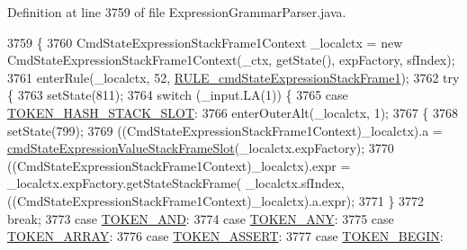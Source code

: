 Definition at line 3759 of file Expression\+Grammar\+Parser.\+java.


\begin{DoxyCode}
3759                                                                                                            
                                                       \{
3760     CmdStateExpressionStackFrame1Context \_localctx = \textcolor{keyword}{new} CmdStateExpressionStackFrame1Context(\_ctx, 
      getState(), expFactory, sfIndex);
3761     enterRule(\_localctx, 52, \hyperlink{classgov_1_1nasa_1_1jpf_1_1inspector_1_1server_1_1expression_1_1parser_1_1_expression_grammar_parser_a36207a7edb5ce0a44295fb39c0ab6bde}{RULE\_cmdStateExpressionStackFrame1});
3762     \textcolor{keywordflow}{try} \{
3763       setState(811);
3764       \textcolor{keywordflow}{switch} (\_input.LA(1)) \{
3765       \textcolor{keywordflow}{case} \hyperlink{classgov_1_1nasa_1_1jpf_1_1inspector_1_1server_1_1expression_1_1parser_1_1_expression_grammar_parser_af911dcf03b24cbbe3be88f0445668139}{TOKEN\_HASH\_STACK\_SLOT}:
3766         enterOuterAlt(\_localctx, 1);
3767         \{
3768         setState(799);
3769         ((CmdStateExpressionStackFrame1Context)\_localctx).a = 
      \hyperlink{classgov_1_1nasa_1_1jpf_1_1inspector_1_1server_1_1expression_1_1parser_1_1_expression_grammar_parser_a6b064d2ec6f62d4260a820ef3c1864e9}{cmdStateExpressionValueStackFrameSlot}(\_localctx.expFactory);
3770          ((CmdStateExpressionStackFrame1Context)\_localctx).expr =  \_localctx.expFactory.getStateStackFrame(
      \_localctx.sfIndex,   ((CmdStateExpressionStackFrame1Context)\_localctx).a.expr); 
3771         \}
3772         \textcolor{keywordflow}{break};
3773       \textcolor{keywordflow}{case} \hyperlink{classgov_1_1nasa_1_1jpf_1_1inspector_1_1server_1_1expression_1_1parser_1_1_expression_grammar_parser_a331667ae98e64b4bcdd3b866e7e2cd64}{TOKEN\_AND}:
3774       \textcolor{keywordflow}{case} \hyperlink{classgov_1_1nasa_1_1jpf_1_1inspector_1_1server_1_1expression_1_1parser_1_1_expression_grammar_parser_a21f8df7c638568302922694eab614972}{TOKEN\_ANY}:
3775       \textcolor{keywordflow}{case} \hyperlink{classgov_1_1nasa_1_1jpf_1_1inspector_1_1server_1_1expression_1_1parser_1_1_expression_grammar_parser_a5245a46acb46b8f00f1e7ef7d32101ea}{TOKEN\_ARRAY}:
3776       \textcolor{keywordflow}{case} \hyperlink{classgov_1_1nasa_1_1jpf_1_1inspector_1_1server_1_1expression_1_1parser_1_1_expression_grammar_parser_a5965ddc9ea8411ed43e28f73def173d2}{TOKEN\_ASSERT}:
3777       \textcolor{keywordflow}{case} \hyperlink{classgov_1_1nasa_1_1jpf_1_1inspector_1_1server_1_1expression_1_1parser_1_1_expression_grammar_parser_aeb1f6ac15295275b80fae4b59d753627}{TOKEN\_BEGIN}:

\end{DoxyCode}
